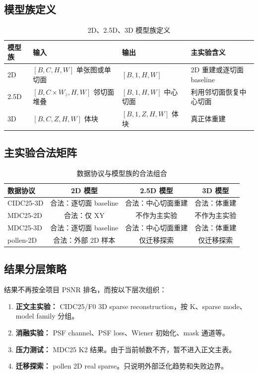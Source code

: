 \documentclass[UTF8, scheme=plain, 11pt, a4paper]{ctexart}
\begin{document}
\subsection{模型族定义}

\begin{table}[H]
  \centering
  \caption{2D、2.5D、3D 模型族定义}
  \label{tab:model_family}
  \begin{tabular}{p{2.2cm}p{4.5cm}p{4.5cm}p{3.2cm}}
    \toprule
    模型族 & 输入 & 输出 & 主实验含义 \\
    \midrule
    2D & $[B,C,H,W]$ 单张图或单切面 & $[B,1,H,W]$ & 2D 重建或逐切面 baseline \\
    2.5D & $[B,C\times W_z,H,W]$ 邻切面堆叠 & $[B,1,H,W]$ 中心切面 & 利用邻切面恢复中心切面 \\
    3D & $[B,C,Z,H,W]$ 体块 & $[B,1,Z,H,W]$ 体块 & 真正体重建 \\
    \bottomrule
  \end{tabular}
\end{table}

\subsection{主实验合法矩阵}

\begin{table}[H]
  \centering
  \caption{数据协议与模型族的合法组合}
  \label{tab:valid_matrix}
  \begin{tabular}{lccc}
    \toprule
    数据协议 & 2D 模型 & 2.5D 模型 & 3D 模型 \\
    \midrule
    CIDC25-3D & 合法：逐切面 baseline & 合法：中心切面重建 & 合法：体重建 \\
    MDC25-2D & 合法：仅 XY & 不作为主实验 & 不作为主实验 \\
    MDC25-3D & 合法：逐切面 baseline & 合法：中心切面重建 & 合法：体重建 \\
    pollen-2D & 合法：外部 2D 样本 & 仅迁移探索 & 仅迁移探索 \\
    \bottomrule
  \end{tabular}
\end{table}

\subsection{结果分层策略}

结果不再按全项目 PSNR 排名，而按以下层次组织：

\begin{enumerate}[leftmargin=*]
  \item \textbf{正文主实验：} CIDC25/F0 3D sparse reconstruction，按 K、sparse mode、model family 分组。
  \item \textbf{消融实验：} PSF channel、PSF loss、Wiener 初始化、mask 通道等。
  \item \textbf{压力测试：} MDC25 K2 结果。由于当前帧数不齐，暂不进入正文主表。
  \item \textbf{迁移探索：} pollen 2D real sparse。只说明外部泛化趋势和失败边界。
\end{enumerate}
\end{document}
